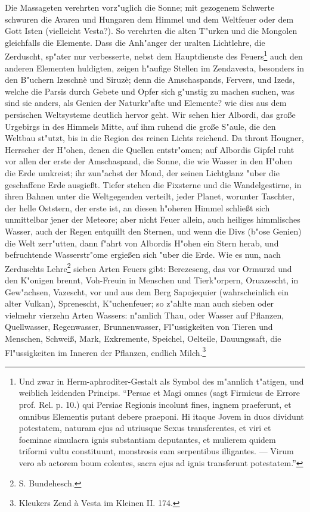 \documentclass[a4paper, 11pt, oneside, polutonikogreek, german]{article}
\begin{document}
Die Massageten verehrten vorz"uglich die Sonne; mit gezogenem Schwerte schwuren die Avaren und Hungaren dem Himmel und dem Weltfeuer oder dem Gott Isten (vielleicht Vesta?). So verehrten die alten T"urken und die Mongolen gleichfalls die Elemente. Dass die Anh"anger der uralten Lichtlehre, die Zerduscht, sp"ater nur verbesserte, nebst dem Hauptdienste des Feuers\footnote{Und zwar in Herm-aphroditer-Gestalt als Symbol des m"annlich t"atigen, und weiblich leidenden Princips. "`Persae et Magi omnes (sagt Firmicus de Errore prof. Rel. p. 10.) qui Persiae Regionis incolunt fines, ingnem praeferunt, et omnibus Elementis putant debere praeponi. Hi itaque Jovem in duos dividunt potestatem, naturam ejus ad utriusque Sexus transferentes, et viri et foeminae simulacra ignis substantiam deputantes, et mulierem quidem triformi vultu constituunt, monstrosis eam serpentibus illigantes. --- Virum vero ab actorem boum colentes, sacra ejus ad ignis transferunt potestatem."'} auch den anderen Elementen huldigten, zeigen h"aufige Stellen im Zendavesta, besonders in den B"uchern Izeschnè und Siruzè; denn die Amschaspands, Fervers, und Izeds, welche die Parsis durch Gebete und Opfer sich g"unstig zu machen suchen, was sind sie anders, als Genien der Naturkr"afte und Elemente? wie dies aus dem persischen Weltsysteme deutlich hervor geht. Wir sehen hier Albordi, das große Urgebirgs in des Himmels Mitte, auf ihm ruhend die große S"aule, die den Weltbau st"utzt, bis in die Region des reinen Lichts reichend. Da thront Hougner, Herrscher der H"ohen, denen die Quellen entstr"omen; auf Albordis Gipfel ruht vor allen der erste der Amschaspand, die Sonne, die wie Wasser in den H"ohen die Erde umkreist; ihr zun"achst der Mond, der seinen Lichtglanz "uber die geschaffene Erde ausgießt. Tiefer stehen die Fixsterne und die Wandelgestirne, in ihren Bahnen unter die Weltgegenden verteilt, jeder Planet, worunter Taschter, der helle Oststern, der erste ist, an diesen h"oheren Himmel schließt sich unmittelbar jener der Meteore; aber nicht Feuer allein, auch heiliges himmlisches Wasser, auch der Regen entquillt den Sternen, und wenn die Divs (b"ose Genien) die Welt zerr"utten, dann f"ahrt von Albordis H"ohen ein Stern herab, und befruchtende Wasserstr"ome ergießen sich "uber die Erde. Wie es nun, nach Zerduschts Lehre\footnote{S. Bundehesch.} sieben Arten Feuers gibt: Berezeseng, das vor Ormurzd und den K"onigen brennt, Voh-Freuin in Menschen und Tierk"orpern, Oruazescht, in Gew"achsen, Vazescht, vor und aus dem Berg Sapojequier (wahrscheinlich ein alter Vulkan), Sprenescht, K"uchenfeuer; so z"ahlte man auch sieben oder vielmehr vierzehn Arten Wassers: n"amlich Thau, oder Wasser auf Pflanzen, Quellwasser, Regenwasser, Brunnenwasser, Fl"ussigkeiten von Tieren und Menschen, Schweiß, Mark, Exkremente, Speichel, Oelteile, Dauungssaft, die Fl"ussigkeiten im Inneren der Pflanzen, endlich Milch.\footnote{Kleukers Zend à Vesta im Kleinen II. 174.}
\end{document}
